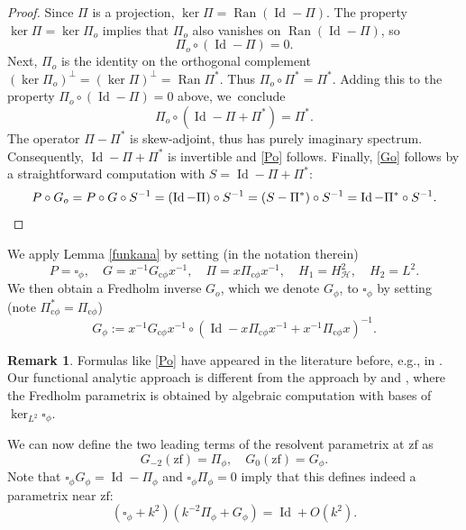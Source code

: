 \documentclass[11pt]{article}
\newcommand{\eg}{e.g.,\xspace}
\numberwithin{equation}{section}
\newcommand{\cphi}{{\mathrm{c}\phi}}
\theoremstyle{plain}
\theoremstyle{definition}
\newtheorem{Rem}[Th]{Remark}
\newcommand{\zf}{{\mathrm{zf}}}
\DeclareMathOperator{\Id}{Id}
\DeclareMathOperator\Ran{Ran}
\newcommand{\Hsplit}{H_{\mathscr{H}}}
\begin{document}
\begin{proof}
Since $\Pi$ is a projection, $\ker \Pi = \Ran(\Id - \Pi)$.
The property $\ker \Pi = \ker \Pi_o$ implies that $\Pi_o$ also vanishes on
$\Ran(\Id - \Pi)$, so
\[
\Pi_o \circ (\Id - \Pi) = 0.
\]
Next, $\Pi_o$ is the identity on the orthogonal complement $(\ker \Pi_o)^\perp = (\ker \Pi)^\perp =
\Ran\Pi^*$. Thus $\Pi_o \circ \Pi^* = \Pi^*$. Adding this to the property
$\Pi_o \circ (\Id - \Pi) = 0$ above, we~conclude
\[
\Pi_o \circ (\Id - \Pi + \Pi^*) = \Pi^*.
\]
The operator $\Pi - \Pi^*$ is skew-adjoint, thus has purely imaginary spectrum.
Consequently, $\Id - \Pi + \Pi^*$ is invertible and \eqref{Po} follows.
Finally, \eqref{Go} follows by a straightforward computation with $S= \Id - \Pi + \Pi^*$:
\[
P\circ G_o=P \circ G \circ S^{-1} =
\left(\Id - \Pi\right) \circ S^{-1}
= \left(S - \Pi^*\right) \circ S^{-1} = \Id - \Pi^* \circ S^{-1}.\qedhere
\]
\end{proof}

We apply Lemma \ref{funkana} by setting (in the notation therein)
\[
P=\square_\phi, \quad G=x^{-1}G_{\cphi}x^{-1}, \quad \Pi=x\Pi_{\cphi}x^{-1},\quad
H_1=\Hsplit^2,\quad H_2=L^2.
\]
We then obtain a Fredholm inverse $G_o$, which we denote $G_\phi$, to $\square_\phi$ by setting (note $\Pi_{\cphi}^*=\Pi_{\cphi}$)
\begin{equation}\label{Gphi}
G_\phi:= x^{-1} G_{\cphi} x^{-1} \circ (\Id - x \Pi_{\cphi} x^{-1} + x^{-1} \Pi_{\cphi} x)^{-1}.
\end{equation}

\begin{Rem}
Formulas like \eqref{Po} have appeared in the literature before, \eg in \cite[Lem.\,3.5]{BLZ09}.
Our functional analytic approach is different from the
approach by \cite{guillarmou2014low} and \cite{guillarmou2008resolvent}, where
the Fredholm parametrix is obtained by algebraic computation with bases of
$\ker_{L^2} \square_{\phi}$.
\end{Rem}

We can now define the two leading terms of the
resolvent parametrix at $\zf$ as
\begin{equation}\label{Gkphi}
G_{-2}(\zf) = \Pi_\phi,\quad G_0(\zf) = G_\phi.
\end{equation}
Note that $\square_{\phi} G_{\phi} = \Id - \Pi_{\phi}$ and $\square_\phi \Pi_\phi=0$ imply that this defines indeed a parametrix near $\zf$:
\begin{equation}
\label{eqn:zf param eqn}
(\square_\phi+k^2)(k^{-2} \Pi_\phi + G_\phi) = \Id + O(k^2).
\end{equation}
\end{document}
